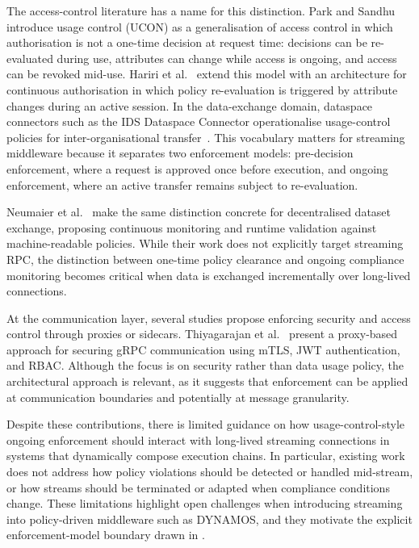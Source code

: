The access-control literature has a name for this distinction. Park and Sandhu~\cite{park2004ucon} introduce usage control (UCON) as a generalisation of access control in which authorisation is not a one-time decision at request time: decisions can be re-evaluated during use, attributes can change while access is ongoing, and access can be revoked mid-use. Hariri et al.~\cite{hariri2023uconplus} extend this model with an architecture for continuous authorisation in which policy re-evaluation is triggered by attribute changes during an active session. In the data-exchange domain, dataspace connectors such as the IDS Dataspace Connector operationalise usage-control policies for inter-organisational transfer~\cite{idsa2023usagecontrol}. This vocabulary matters for streaming middleware because it separates two enforcement models: pre-decision enforcement, where a request is approved once before execution, and ongoing enforcement, where an active transfer remains subject to re-evaluation.

Neumaier et al.~\cite{neumaier2021policyaware} make the same distinction concrete for decentralised dataset exchange, proposing continuous monitoring and runtime validation against machine-readable policies. While their work does not explicitly target streaming RPC, the distinction between one-time policy clearance and ongoing compliance monitoring becomes critical when data is exchanged incrementally over long-lived connections.

At the communication layer, several studies propose enforcing security and access control through proxies or sidecars. Thiyagarajan et al.~\cite{thiyagarajan2025grpcsecurity} present a proxy-based approach for securing gRPC communication using mTLS, JWT authentication, and RBAC. Although the focus is on security rather than data usage policy, the architectural approach is relevant, as it suggests that enforcement can be applied at communication boundaries and potentially at message granularity.

Despite these contributions, there is limited guidance on how usage-control-style ongoing enforcement should interact with long-lived streaming connections in systems that dynamically compose execution chains. In particular, existing work does not address how policy violations should be detected or handled mid-stream, or how streams should be terminated or adapted when compliance conditions change. These limitations highlight open challenges when introducing streaming into policy-driven middleware such as DYNAMOS, and they motivate the explicit enforcement-model boundary drawn in .


